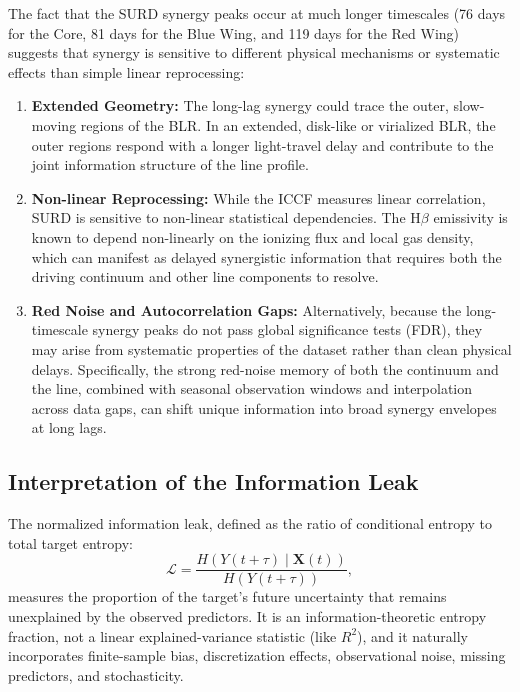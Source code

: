 \documentclass[12pt, a4paper]{article}
\begin{document}
The fact that the SURD synergy peaks occur at much longer timescales (76 days for the Core, 81 days for the Blue Wing, and 119 days for the Red Wing) suggests that synergy is sensitive to different physical mechanisms or systematic effects than simple linear reprocessing:
\begin{enumerate}
\item \textbf{Extended Geometry:} The long-lag synergy could trace the outer, slow-moving regions of the BLR. In an extended, disk-like or virialized BLR, the outer regions respond with a longer light-travel delay and contribute to the joint information structure of the line profile.
\item \textbf{Non-linear Reprocessing:} While the ICCF measures linear correlation, SURD is sensitive to non-linear statistical dependencies. The H\(\beta\) emissivity is known to depend non-linearly on the ionizing flux and local gas density, which can manifest as delayed synergistic information that requires both the driving continuum and other line components to resolve.
\item \textbf{Red Noise and Autocorrelation Gaps:} Alternatively, because the long-timescale synergy peaks do not pass global significance tests (FDR), they may arise from systematic properties of the dataset rather than clean physical delays. Specifically, the strong red-noise memory of both the continuum and the line, combined with seasonal observation windows and interpolation across data gaps, can shift unique information into broad synergy envelopes at long lags.
\end{enumerate}

\subsection{Interpretation of the Information Leak}

The normalized information leak, defined as the ratio of conditional entropy to total target entropy:
\begin{equation}
\mathcal{L} = \frac{H(Y(t+\tau) \mid \mathbf{X}(t))}{H(Y(t+\tau))},
\end{equation}
measures the proportion of the target's future uncertainty that remains unexplained by the observed predictors. It is an information-theoretic entropy fraction, not a linear explained-variance statistic (like $R^2$), and it naturally incorporates finite-sample bias, discretization effects, observational noise, missing predictors, and stochasticity.
\end{document}
